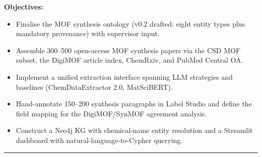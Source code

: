 \documentclass[11pt,a4paper]{article}
\newcommand{\srhrule}{\vspace{0.4ex}\noindent\textcolor{srhorange}{\rule{\linewidth}{0.4pt}}\vspace{0.6ex}}
\begin{document}
\textbf{Objectives:}
\begin{itemize}
  \item Finalise the MOF synthesis ontology (v0.2 drafted: eight entity types plus mandatory provenance) with supervisor input.
  \item Assemble 300--500 open-access MOF synthesis papers via the CSD MOF subset, the DigiMOF article index, ChemRxiv, and PubMed Central OA.
  \item Implement a unified extraction interface spanning LLM strategies and baselines (ChemDataExtractor 2.0, MatSciBERT).
  \item Hand-annotate 150--200 synthesis paragraphs in Label Studio and define the field mapping for the DigiMOF/SynMOF agreement analysis.
  \item Construct a Neo4j KG with chemical-name entity resolution and a Streamlit dashboard with natural-language-to-Cypher querying.
\end{itemize}
\srhrule

\end{document}
